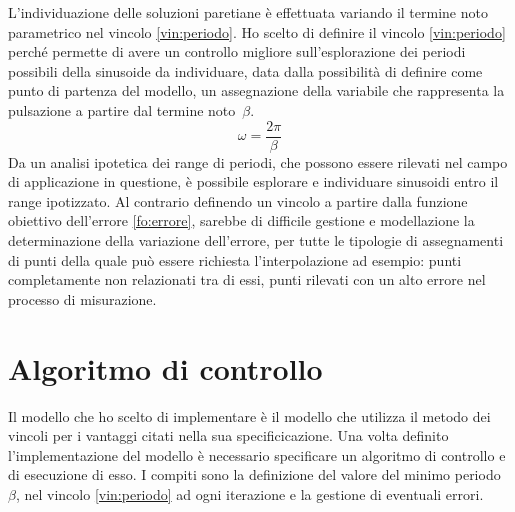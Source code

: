 \documentclass[a4paper,12pt]{report}
\begin{document}
L'individuazione delle soluzioni paretiane è effettuata variando il termine noto parametrico nel vincolo \eqref{vin:periodo}.
Ho scelto di definire il vincolo \eqref{vin:periodo} perché permette di avere un controllo migliore sull'esplorazione dei periodi possibili della sinusoide da individuare, data dalla possibilità di definire come punto di partenza del modello, un assegnazione della variabile che rappresenta la pulsazione a partire dal termine noto~$\beta $.
\begin{equation}
  \omega = \frac{2\pi}{\beta}
\end{equation}
Da un analisi ipotetica dei range di periodi, che possono essere rilevati nel campo di applicazione in questione, è possibile esplorare e individuare sinusoidi entro il range ipotizzato. Al contrario definendo un vincolo a partire dalla funzione obiettivo dell'errore \eqref{fo:errore}, sarebbe di difficile gestione e modellazione la determinazione della variazione dell'errore, per tutte le tipologie di assegnamenti di punti della quale può essere richiesta l'interpolazione ad esempio: punti completamente non relazionati tra di essi, punti rilevati con un alto errore nel processo di misurazione.


\section{Algoritmo di controllo}
\label{ss:controllo}
Il modello che ho scelto di implementare è il modello che utilizza il metodo dei vincoli per i vantaggi citati nella sua specificicazione. Una volta definito l'implementazione del modello è necessario specificare un algoritmo di controllo e di esecuzione di esso. I compiti sono la definizione del valore del minimo periodo $ \beta $, nel vincolo \eqref{vin:periodo} ad ogni iterazione e la gestione di eventuali errori.
\end{document}
